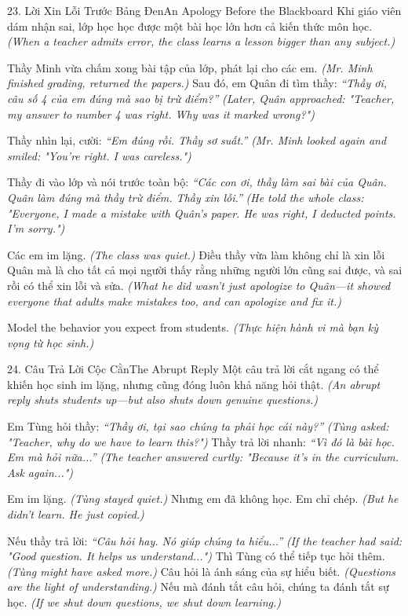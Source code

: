 \begin{truyen}{23. Lời Xin Lỗi Trước Bảng Đen}{An Apology Before the Blackboard}
Khi giáo viên dám nhận sai, lớp học học được một bài học lớn hơn cả kiến thức môn học.
\textit{(When a teacher admits error, the class learns a lesson bigger than any subject.)}

Thầy Minh vừa chấm xong bài tập của lớp, phát lại cho các em.
\textit{(Mr. Minh finished grading, returned the papers.)}
Sau đó, em Quân đi tìm thầy: \textit{``Thầy ơi, câu số 4 của em đúng mà sao bị trừ điểm?''}
\textit{(Later, Quân approached: "Teacher, my answer to number 4 was right. Why was it marked wrong?")}

Thầy nhìn lại, cười: \textit{``Em đúng rồi. Thầy sơ suất.''}
\textit{(Mr. Minh looked again and smiled: "You're right. I was careless.")}

Thầy đi vào lớp và nói trước toàn bộ: \textit{``Các con ơi, thầy làm sai bài của Quân. Quân làm đúng mà thầy trừ điểm. Thầy xin lỗi.''}
\textit{(He told the whole class: "Everyone, I made a mistake with Quân's paper. He was right, I deducted points. I'm sorry.")}

Các em im lặng.
\textit{(The class was quiet.)}
Điều thầy vừa làm không chỉ là xin lỗi Quân mà là cho tất cả mọi người thấy rằng những người lớn cũng sai được, và sai rồi có thể xin lỗi và sửa.
\textit{(What he did wasn't just apologize to Quân—it showed everyone that adults make mistakes too, and can apologize and fix it.)}
\end{truyen}

\begin{ghinhoanh}
Model the behavior you expect from students.
\textit{(Thực hiện hành vi mà bạn kỳ vọng từ học sinh.)}
\end{ghinhoanh}

\begin{truyen}{24. Câu Trả Lời Cộc Cằn}{The Abrupt Reply}
Một câu trả lời cắt ngang có thể khiến học sinh im lặng, nhưng cũng đóng luôn khả năng hỏi thật.
\textit{(An abrupt reply shuts students up—but also shuts down genuine questions.)}

Em Tùng hỏi thầy: \textit{``Thầy ơi, tại sao chúng ta phải học cái này?''}
\textit{(Tùng asked: "Teacher, why do we have to learn this?")}
Thầy trả lời nhanh: \textit{``Vì đó là bài học. Em mà hỏi nữa...''}
\textit{(The teacher answered curtly: "Because it's in the curriculum. Ask again...")}

Em im lặng.
\textit{(Tùng stayed quiet.)}
Nhưng em đã không học. Em chỉ chép.
\textit{(But he didn't learn. He just copied.)}

Nếu thầy trả lời: \textit{``Câu hỏi hay. Nó giúp chúng ta hiểu...''}
\textit{(If the teacher had said: "Good question. It helps us understand...")}
Thì Tùng có thể tiếp tục hỏi thêm.
\textit{(Tùng might have asked more.)}
Câu hỏi là ánh sáng của sự hiểu biết.
\textit{(Questions are the light of understanding.)}
Nếu mà đánh tắt câu hỏi, chúng ta đánh tắt sự học.
\textit{(If we shut down questions, we shut down learning.)}
\end{truyen}

